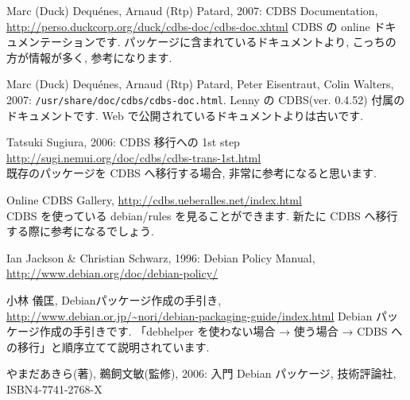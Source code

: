 \documentclass[mingoth,a4paper]{jsarticle}
\begin{document}
\newpage
\begin{thebibliography}{99}
                    Marc (Duck) Dequ\'enes,
                    Arnaud (Rtp) Patard, 
                    2007:
                    CDBS Documentation,
                    \url{http://perso.duckcorp.org/duck/cdbs-doc/cdbs-doc.xhtml}
                    \newline
                    CDBS の online ドキュメンテーションです. 
                    パッケージに含まれているドキュメントより, 
                    こっちの方が情報が多く, 参考になります.
                    
                    Marc (Duck) Dequ\'enes,
                    Arnaud (Rtp) Patard, 
                    Peter Eisentraut,
                    Colin Walters,
                    2007:
                    {\tt /usr/share/doc/cdbs/cdbs-doc.html}.
                    \newline
                    Lenny の CDBS(ver. 0.4.52) 付属のドキュメントです.
                    Web で公開されているドキュメントよりは古いです.

                    Tatsuki Sugiura, 2006:
                    CDBS 移行への 1st step
                    \url{http://sugi.nemui.org/doc/cdbs/cdbs-trans-1st.html}\\
                    既存のパッケージを CDBS へ移行する場合, 
                    非常に参考になると思います.

                    Online CDBS Gallery, 
                    \url{http://cdbs.ueberalles.net/index.html}\\
                    CDBS を使っている debian/rules を見ることができます.
                    新たに CDBS へ移行する際に参考になるでしょう.
                    
                    Ian Jackson \& Christian Schwarz, 1996:
                    Debian Policy Manual,
                    \url{http://www.debian.org/doc/debian-policy/}

                    小林 儀匡, 
                    Debianパッケージ作成の手引き,
                    \url{http://www.debian.or.jp/~nori/debian-packaging-guide/index.html}
                    \newline
                    Debian パッケージ作成の手引きです.
                    「debhelper を使わない場合 → 
                    使う場合 →
                    CDBS への移行」と順序立てて説明されています.

                    やまだあきら(著), 鵜飼文敏(監修), 2006:
                    入門 Debian パッケージ, 技術評論社,
                    ISBN4-7741-2768-X
\end{thebibliography}
\setcounter{figure}{0}
\setcounter{table}{0}
\end{document}
